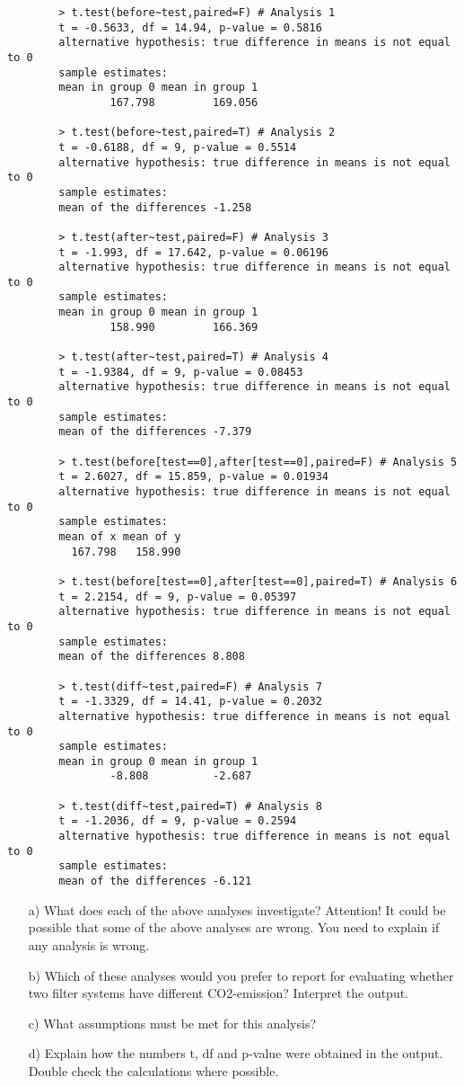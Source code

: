 \documentclass[12pt,a4paper]{article}
\begin{document}
	\begin{verbatim}
		> t.test(before~test,paired=F) # Analysis 1
		t = -0.5633, df = 14.94, p-value = 0.5816
		alternative hypothesis: true difference in means is not equal to 0
		sample estimates:
		mean in group 0 mean in group 1
		        167.798         169.056
		
		> t.test(before~test,paired=T) # Analysis 2
		t = -0.6188, df = 9, p-value = 0.5514
		alternative hypothesis: true difference in means is not equal to 0
		sample estimates:
		mean of the differences -1.258
		
		> t.test(after~test,paired=F) # Analysis 3
		t = -1.993, df = 17.642, p-value = 0.06196
		alternative hypothesis: true difference in means is not equal to 0
		sample estimates:
		mean in group 0 mean in group 1
		        158.990         166.369
		
		> t.test(after~test,paired=T) # Analysis 4
		t = -1.9384, df = 9, p-value = 0.08453
		alternative hypothesis: true difference in means is not equal to 0
		sample estimates:
		mean of the differences -7.379
		
		> t.test(before[test==0],after[test==0],paired=F) # Analysis 5
		t = 2.6027, df = 15.859, p-value = 0.01934
		alternative hypothesis: true difference in means is not equal to 0
		sample estimates:
		mean of x mean of y
		  167.798   158.990
		
		> t.test(before[test==0],after[test==0],paired=T) # Analysis 6
		t = 2.2154, df = 9, p-value = 0.05397
		alternative hypothesis: true difference in means is not equal to 0
		sample estimates:
		mean of the differences 8.808
		
		> t.test(diff~test,paired=F) # Analysis 7
		t = -1.3329, df = 14.41, p-value = 0.2032
		alternative hypothesis: true difference in means is not equal to 0
		sample estimates:
		mean in group 0 mean in group 1
		        -8.808          -2.687
		
		> t.test(diff~test,paired=T) # Analysis 8
		t = -1.2036, df = 9, p-value = 0.2594
		alternative hypothesis: true difference in means is not equal to 0
		sample estimates:
		mean of the differences -6.121
	\end{verbatim}
	
	\begin{enumerate}
		\item[a)] What does each of the above analyses investigate? Attention! It could be possible that some of the above analyses are wrong. You need to explain if any analysis is wrong.
		\item[b)] Which of these analyses would you prefer to report for evaluating whether two filter systems have different CO2-emission? Interpret the output.
		\item[c)] What assumptions must be met for this analysis?
		\item[d)] Explain how the numbers t, df and p-value were obtained in the output. Double check the calculations where possible.
	\end{enumerate}
	
\end{document}
